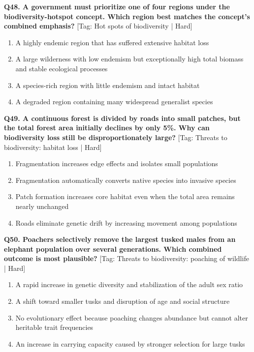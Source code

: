 \noindent\textbf{Q48. A government must prioritize one of four regions under the biodiversity-hotspot concept. Which region best matches the concept's combined emphasis?} \hfill [Tag: Hot spots of biodiversity | Hard]
\begin{enumerate}[label=(\alph*),topsep=2pt,itemsep=1pt,partopsep=0pt,parsep=0pt]
    \item {A highly endemic region that has suffered extensive habitat loss}
    \item {A large wilderness with low endemism but exceptionally high total biomass and stable ecological processes}
    \item {A species-rich region with little endemism and intact habitat}
    \item {A degraded region containing many widespread generalist species}
\end{enumerate}
\vspace{2mm}

\noindent\textbf{Q49. A continuous forest is divided by roads into small patches, but the total forest area initially declines by only 5\%. Why can biodiversity loss still be disproportionately large?} \hfill [Tag: Threats to biodiversity: habitat loss | Hard]
\begin{enumerate}[label=(\alph*),topsep=2pt,itemsep=1pt,partopsep=0pt,parsep=0pt]
    \item {Fragmentation increases edge effects and isolates small populations}
    \item {Fragmentation automatically converts native species into invasive species}
    \item {Patch formation increases core habitat even when the total area remains nearly unchanged}
    \item {Roads eliminate genetic drift by increasing movement among populations}
\end{enumerate}
\vspace{2mm}

\noindent\textbf{Q50. Poachers selectively remove the largest tusked males from an elephant population over several generations. Which combined outcome is most plausible?} \hfill [Tag: Threats to biodiversity: poaching of wildlife | Hard]
\begin{enumerate}[label=(\alph*),topsep=2pt,itemsep=1pt,partopsep=0pt,parsep=0pt]
    \item {A rapid increase in genetic diversity and stabilization of the adult sex ratio}
    \item {A shift toward smaller tusks and disruption of age and social structure}
    \item {No evolutionary effect because poaching changes abundance but cannot alter heritable trait frequencies}
    \item {An increase in carrying capacity caused by stronger selection for large tusks}
\end{enumerate}
\vspace{2mm}

